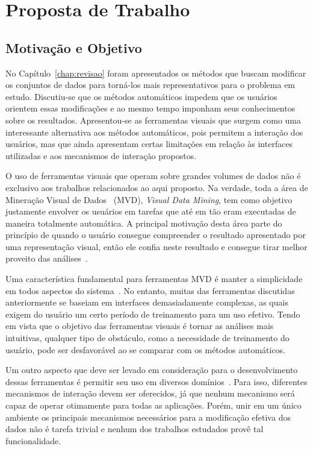 \chapter{Proposta de Trabalho}\label{chap:proposta}

\section{Motivação e Objetivo}

No Capítulo~\ref{chap:revisao} foram apresentados os métodos
que buscam modificar os conjuntos de dados para torná-los
mais representativos para o problema em estudo.  Discutiu-se
que os métodos automáticos impedem que os usuários orientem
essas modificações e ao mesmo tempo imponham seus
conhecimentos sobre os resultados.  Apresentou-se as
ferramentas visuais que surgem como uma interessante
alternativa aos métodos automáticos, pois permitem a
interação dos usuários, mas que ainda apresentam certas
limitações em relação às interfaces utilizadas e aos
mecanismos de interação propostos.

O uso de ferramentas visuais que operam sobre grandes
volumes de dados não é exclusivo aos trabalhos relacionados
ao aqui proposto. Na verdade, toda a área de
Mineração Visual de Dados~\cite{Wong1999} (MVD),
\emph{Visual Data Mining}, tem como objetivo justamente
envolver os usuários em tarefas que até em tão eram
executadas de maneira totalmente automática. A principal
motivação desta área parte do princípio de quando o usuário
consegue compreender o resultado apresentado por uma
representação visual, então ele confia neste resultado e
consegue tirar melhor proveito das análises~\cite{Wong1999}.

Uma característica fundamental para ferramentas MVD é manter
a simplicidade em todos aspectos do sistema~\cite{Wong1999}.
No entanto, muitas das ferramentas discutidas anteriormente
se baseiam em interfaces demasiadamente complexas, as quais
exigem do usuário um certo período de treinamento para um
uso efetivo. Tendo em vista que o objetivo das ferramentas
visuais é tornar as análises mais intuitivas, qualquer tipo
de obstáculo, como a necessidade de treinamento do usuário,
pode ser desfavorável ao se comparar com os métodos
automáticos.

Um outro aspecto que deve ser levado em consideração para o
desenvolvimento dessas ferramentas é permitir seu uso em
diversos domínios~\cite{Wong1999}. Para isso, diferentes
mecanismos de interação devem ser oferecidos, já que nenhum
mecanismo será capaz de operar otimamente para todas as
aplicações. Porém, unir em um único ambiente os principais
mecanismos necessários para a modificação efetiva dos dados
não é tarefa trivial e nenhum dos trabalhos estudados provê
tal funcionalidade.

